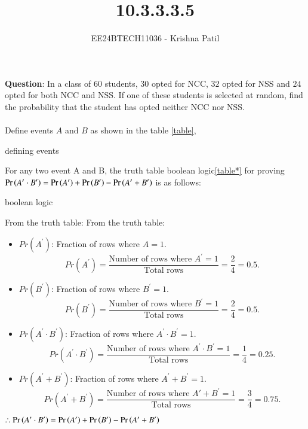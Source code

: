 \documentclass[journal]{IEEEtran}
\begin{document}

\vspace{3cm}

\title{10.3.3.3.5}
\author{EE24BTECH11036 - Krishna Patil}
{\let\newpage\relax\maketitle}
\renewcommand{\thefigure}{\theenumi}
\renewcommand{\thetable}{\theenumi}
\setlength{\intextsep}{10pt} %


\textbf{Question}: In a class of $60$ students, $30$ opted for NCC, $32$ opted for NSS and $24$ opted for both NCC and NSS. If one of these students is selected at random, find the probability that the student has opted neither NCC nor NSS. \\ \\
\solution
Define events $A$ and $B$ as shown in the table \ref{table}, \\
\begin{table}[h!]    
  \centering
  
  \caption{defining events}
  \label{table}
\end{table}
\newline For any two event A and B, the truth table {boolean logic}\ref{table*} for proving $\Pr\left(A^\prime \cdot B^\prime\right) = \Pr\left(A^\prime\right) + \Pr\left(B^\prime\right) - \Pr\left(A^\prime + B^\prime\right)$ is as follows:  \\
\begin{table}[h!]    
  \centering
  
  \caption{boolean logic}
  \label{table*}
\end{table}
\newline From the truth table:
From the truth table:
\begin{itemize}
    \item \( Pr(A^\prime) \): Fraction of rows where \( A = 1 \).
    \[
    Pr(A^\prime) = \frac{\text{Number of rows where } A^\prime = 1}{\text{Total rows}} = \frac{2}{4} = 0.5.
    \]
    \item \( Pr(B^\prime) \): Fraction of rows where \( B^\prime = 1 \).
    \[
    Pr(B^\prime) = \frac{\text{Number of rows where } B^\prime = 1}{\text{Total rows}} = \frac{2}{4} = 0.5.
    \]
    \item \( Pr(A^\prime \cdot B^\prime) \): Fraction of rows where \( A^\prime \cdot B^\prime = 1 \).
    \[
    Pr(A^\prime \cdot B^\prime) = \frac{\text{Number of rows where } A^\prime \cdot B^\prime = 1}{\text{Total rows}} = \frac{1}{4} = 0.25.
    \]
    \item \( Pr(A^\prime + B^\prime) \): Fraction of rows where \( A^\prime + B^\prime = 1 \).
    \[
    Pr(A^\prime + B^\prime) = \frac{\text{Number of rows where } A\prime + B^\prime = 1}{\text{Total rows}} = \frac{3}{4} = 0.75.
    \]
   \end{itemize}
   \newline $\therefore \Pr\left(A^\prime \cdot B^\prime\right) = \Pr\left(A^\prime\right) +  \Pr\left(B^\prime\right) - \Pr\left(A^\prime + B^\prime\right)$
   
\end{document}
